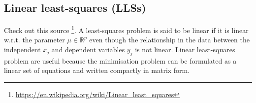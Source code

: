 \documentclass[../main.tex]{subfiles}
\begin{document}
\subsection{Linear least-squares (LLSs)}\label{subsec1.1}
Check out this source \footnote{\url{https://en.wikipedia.org/wiki/Linear_least_squares}}.
A least-squares problem is said to be linear if it is linear w.r.t. the parameter $\mu\in \mathbb{R}^{p}$ even though the relationship in the data between the independent $x_{j}$ and dependent variables $y_{j}$ is not linear.
Linear least-squares problem are useful because the minimisation problem can be formulated as a linear set of equations and written compactly in matrix form. 

\end{document}
